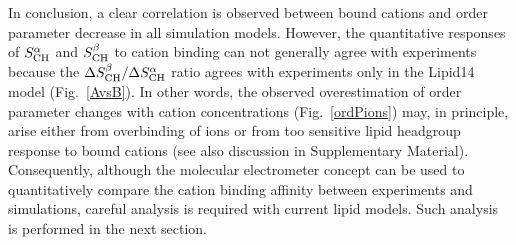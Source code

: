 \documentclass[pre,aps,floatfix,authordate1-4,twocolumn]{revtex4-1}
\begin{document}
In conclusion, a clear correlation is observed between bound cations and order parameter decrease 
in all simulation models. However, the quantitative responses of $S_{\rm{CH}}^{\alpha}$ and $S_{\rm{CH}}^{\beta}$
to cation binding can not generally agree with experiments because the $\Delta S_{\rm{CH}}^{\beta}/\Delta S_{\rm{CH}}^{\alpha}$ ratio  
agrees with experiments only in the Lipid14 model (Fig.~\ref{AvsB}). In other words, the observed 
overestimation of order parameter changes with cation concentrations (Fig.~\ref{ordPions}) may, in principle, arise
either from overbinding of ions or from too sensitive lipid headgroup response to bound cations 
(see also discussion in Supplementary Material). Consequently, although the molecular electrometer concept can be 
used to quantitatively compare the cation binding affinity between experiments and simulations, 
careful analysis is required with current lipid models. Such analysis is performed in the next section.
\end{document}
